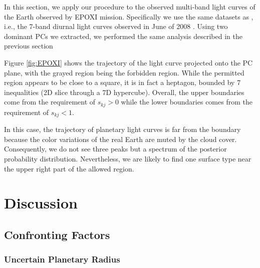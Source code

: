 \documentclass[iop,numberedappendix,apj]{emulateapj}
\begin{document}



In this section, we apply our procedure to the observed multi-band light curves of the Earth observed by EPOXI mission. 
Specifically we use the same datasets as \citet{Cowan2013}, i.e., the 7-band diurnal light curves observed in June of 2008 \citep{Livengood2011}. 
Using two dominant PCs we extracted, we performed the same analysis described in the previous section 

Figure \ref{fig:EPOXI} shows the trajectory of the light curve projected onto the PC plane, with the grayed region being the forbidden region. 
While the permitted region appears to be close to a square, it is in fact a heptagon, bounded by 7 inequalities (2D slice through a 7D hypercube). 
Overall, the upper boundaries come from the requirement of $s_{kj}>0$ while the lower boundaries comes from the requirement of $s_{kj}<1$. 

In this case, the trajectory of planetary light curves is far from the boundary because the color variations of the real Earth are muted by the cloud cover. 
Consequently, we do not see three peaks but a spectrum of the posterior probability distribution. 
Nevertheless, we are likely to find one surface type near the upper right part of the allowed region. 




\section{Discussion}
\label{s:discussion}

\subsection{Confronting Factors}
\label{ss:confonting_factors}


\subsubsection{Uncertain Planetary Radius}

\end{document}

